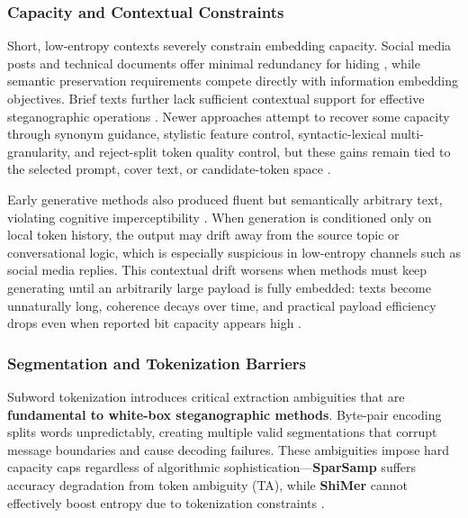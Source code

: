 \subsubsection{Capacity and Contextual Constraints}

Short, low-entropy contexts severely constrain embedding capacity. Social media posts and technical documents offer minimal redundancy for hiding \cite{liao2024co}, while semantic preservation requirements compete directly with information embedding objectives. Brief texts further lack sufficient contextual support for effective steganographic operations \cite{ding2023context}. Newer approaches attempt to recover some capacity through synonym guidance, stylistic feature control, syntactic-lexical multi-granularity, and reject-split token quality control, but these gains remain tied to the selected prompt, cover text, or candidate-token space \cite{kuznetsov2025deepstego,wozniak2025multicriteria,ou2025multigranularity,wang2025rsstega}.

Early generative methods also produced fluent but semantically arbitrary text, violating cognitive imperceptibility \cite{ding2023context}. When generation is conditioned only on local token history, the output may drift away from the source topic or conversational logic, which is especially suspicious in low-entropy channels such as social media replies. This contextual drift worsens when methods must keep generating until an arbitrarily large payload is fully embedded: texts become unnaturally long, coherence decays over time, and practical payload efficiency drops even when reported bit capacity appears high \cite{li2024semantic,xiang2023cpg,steinebach2024natural,xu2024beyond}.

\subsubsection{Segmentation and Tokenization Barriers}

Subword tokenization introduces critical extraction ambiguities that are \textbf{fundamental to white-box steganographic methods}. Byte-pair encoding splits words unpredictably, creating multiple valid segmentations that corrupt message boundaries and cause decoding failures. These ambiguities impose hard capacity caps regardless of algorithmic sophistication---\textbf{SparSamp} suffers accuracy degradation from token ambiguity (TA), while \textbf{ShiMer} cannot effectively boost entropy due to tokenization constraints \cite{qi2024provably}.

